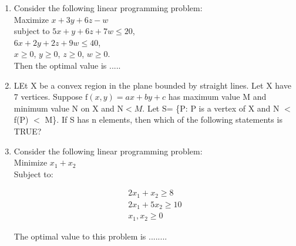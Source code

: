 \documentclass[journal,12pt,twocolumn]{IEEEtran}
\begin{document}
\begin{enumerate}
\item Consider the following linear programming problem: \\
Maximize $x \! + \! 3y \! + \! 6z \! - \! w$ \\
subject to $5x \! + \! y \! + \! 6z + \! 7w \! \leqslant \! 20$, \\
$6x \! + \! 2y \! + 2z \! + \! 9w \! \leqslant \! 40$, \\
$x \! \geqslant \! 0$, $y \! \geqslant \! 0$, $z \! \geqslant \! 0$, $w \! \geqslant \! 0$. \\
Then the optimal value is .....

\item LEt X be a convex region in the plane bounded by straight lines. Let X have 7 vertices. Suppose $\text{f}(x,y) \! = \! ax \! + \! by \! + \! c$ has maximum value M and minimum value N on X and $\text{N} \! < \! M$. Let S= \{P: P is a vertex of X and N $<$ f(P) $<$ M\}. If S has n elements, then which of the following statements is TRUE?
\begin{enumerate}[(A)]
\end{enumerate}

\item Consider the following linear programming problem: \\
Minimize $x_1 \! + \! x_2$ \\
Subject to: \\
\begin{center}
\begin{align*}
2x_1 \! + \! x_2 \! \geqslant \! 8 \\
2x_1 \! + \! 5x_2 \! \geqslant \! 10 \\
x_1, \! x_2 \! \geqslant \! 0 
\end{align*}
\end{center}
\medskip
The optimal value to this problem is ........


\end{enumerate}
\end{document}
